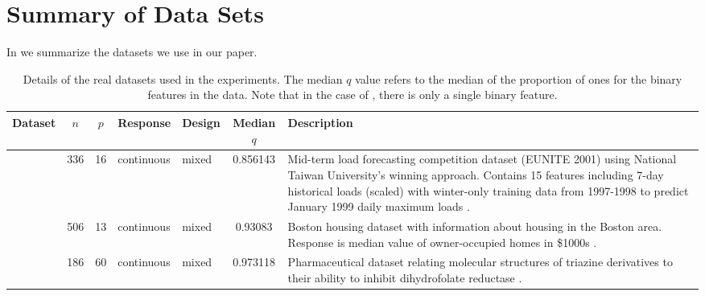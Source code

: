 \section{Summary of Data Sets}\label{sec:data-summary}

In  we summarize the datasets we use in our paper.

\begin{table}
  \centering
  \caption{Details of the real datasets used in the experiments. The median \(q\) value
    refers to the median of the proportion of ones for the binary features in the data. Note that in the case of , there is
    only a single binary feature.}
  \label{tab:dataset-info}
  \small
  \begin{tabular}{
      l
      S[table-format=4.0]
      S[table-format=4.0]
      l
      l
      S[table-format=1.3,round-mode=places,round-precision=3]
      p{6cm}
    }
    \toprule
    Dataset           & {\(n\)} & {\(p\)} & Response   & Design     & {Median \(q\)} & Description                                                                                                                                                                                                                                                                                 \\
    \midrule

     & 336     & 16      & continuous & mixed      & 0.856143       & Mid-term load forecasting competition dataset (EUNITE 2001) using National Taiwan University's winning approach. Contains 15 features including 7-day historical loads (scaled) with winter-only training data from 1997-1998 to predict January 1999 daily maximum loads \citep{chen2004}. \\

    \addlinespace
        & 506     & 13      & continuous & mixed      & 0.93083        & Boston housing dataset with information about housing in the Boston area. Response is median value of owner-occupied homes in \$1000s \citep{harrison1978}.                                                                                                                                 \\

    \addlinespace
      & 186     & 60      & continuous & mixed      & 0.973118       & Pharmaceutical dataset relating molecular structures of triazine derivatives to their ability to inhibit dihydrofolate reductase \citep{hirst1994,king1995}.                                                                                                                                \\


\end{tabular}
\end{table}
